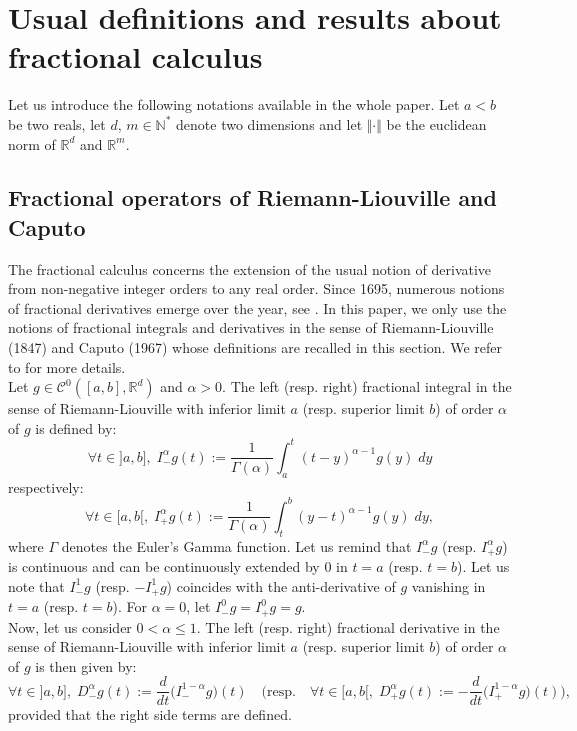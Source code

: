 \documentclass[english,11pt,reqno]{smfart}
\def\di{\displaystyle}
\newcommand{\N}{\mathbb{N}}
\newcommand{\R}{\mathbb{R}}
\newcommand{\CC}{\mathscr{C}}
\newcommand{\DM}{D^\alpha_-}
\newcommand{\DP}{D^\alpha_+}
\begin{document}
\parindent 0pt

\section{Usual definitions and results about fractional calculus}\label{section1}
Let us introduce the following notations available in the whole paper. Let $a < b$ be two reals, let $d$, $m \in \N^*$ denote two dimensions and let $\Vert \cdot \Vert$ be the euclidean norm of $\R^d$ and $\R^m$.

\subsection{Fractional operators of Riemann-Liouville and Caputo}\label{section11}
The fractional calculus concerns the extension of the usual notion of derivative from non-negative integer orders to any real order. Since 1695, numerous notions of fractional derivatives emerge over the year, see \cite{kilb,podl,samk}. In this paper, we only use the notions of fractional integrals and derivatives in the sense of Riemann-Liouville (1847) and Caputo (1967) whose definitions are recalled in this section. We refer to \cite{kilb,podl,samk} for more details. \\

Let $g \in \CC^0 ([a,b],\R^d)$ and $\alpha > 0$. The left (resp. right) fractional integral in the sense of Riemann-Liouville with inferior limit $a$ (resp. superior limit $b$) of order $ \alpha $ of $g$ is defined by:
\begin{equation}
\forall t \in ]a,b], \; I^{\alpha}_- g (t) := \dfrac{1}{\Gamma (\alpha)} \di \int_a^t (t-y)^{\alpha -1} g(y) \; dy
\end{equation}
respectively:
\begin{equation}
\forall t \in [a,b[, \; I^{\alpha}_+ g (t) := \dfrac{1}{\Gamma (\alpha)} \di \int_t^b (y-t)^{\alpha -1} g(y) \; dy,
\end{equation}
where $\Gamma$ denotes the Euler's Gamma function. Let us remind that $I^\alpha_- g$ (resp. $I^\alpha_+ g$) is continuous and can be continuously extended by $0$ in $t=a$ (resp. $t=b$). Let us note that $I^1_- g$ (resp. $-I^1_+ g$) coincides with the anti-derivative of $g$ vanishing in $t=a$ (resp. $t=b$). For $\alpha =0$, let $I^0_- g = I^0_+ g = g$. \\

Now, let us consider $0 < \alpha \leq 1$. The left (resp. right) fractional derivative in the sense of Riemann-Liouville with inferior limit $a$ (resp. superior limit $b$) of order $\alpha $ of $g$ is then given by:
\begin{equation}
\forall t \in ]a,b], \; \DM g(t) := \dfrac{d}{dt} \big( I^{1-\alpha}_- g \big) (t) \quad \Big( \text{resp.} \quad \forall t \in [a,b[, \; \DP g(t) := -\dfrac{d}{dt} \big( I^{1-\alpha}_+ g \big) (t) \Big),
\end{equation}
provided that the right side terms are defined. \\
\end{document}
